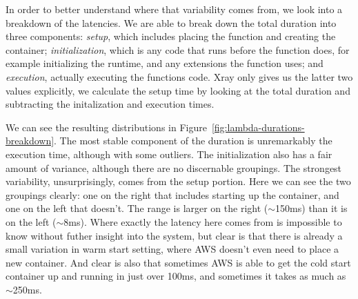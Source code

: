 In order to better understand where that variability comes from, we look into a
breakdown of the latencies. We are able to break down the total duration into
three components: \textit{setup}, which includes placing the function and
creating the container; \textit{initialization}, which is any code that runs
before the function does, for example initializing the runtime, and any
extensions the function uses; and \textit{execution}, actually executing the
functions code. Xray only gives us the latter two values explicitly, we
calculate the setup time by looking at the total duration and subtracting the
initalization and execution times. 

We can see the resulting distributions in
Figure~\ref{fig:lambda-durations-breakdown}. The most stable component of the
duration is unremarkably the execution time, although with some outliers. The
initialization also has a fair amount of variance, although there are no
discernable groupings. The strongest variability, unsurprisingly, comes from the
setup portion. Here we can see the two groupings clearly: one on the right that
includes starting up the container, and one on the left that doesn't. The range
is larger on the right ($\sim$150ms) than it is on the left ($\sim$8ms). Where
exactly the latency here comes from is impossible to know without futher insight
into the system, but clear is that there is already a small variation in warm
start setting, where AWS doesn't even need to place a new container. And clear
is also that sometimes AWS is able to get the cold start container up and
running in just over 100ms, and sometimes it takes as much as $\sim$250ms.

